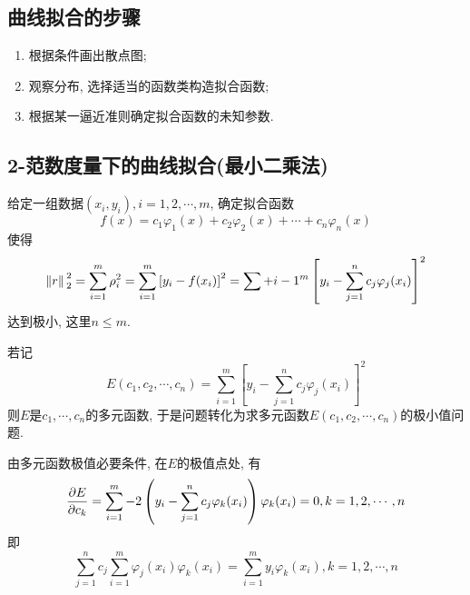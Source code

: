 \subsection{曲线拟合的步骤}

\begin{enumerate}
    \item 根据条件画出散点图;
    \item 观察分布, 选择适当的函数类构造拟合函数;
    \item 根据某一逼近准则确定拟合函数的未知参数.
\end{enumerate}

\subsection{2-范数度量下的曲线拟合(最小二乘法)}

给定一组数据$(x_i,y_i), i=1,2,\cdots,m$, 确定拟合函数
\begin{equation*}
    f(x)=c_1\varphi_1(x)+c_2\varphi_2(x)+\cdots+c_n\varphi_n(x)
\end{equation*}
使得
\begin{equation*}
    \norm*{r}_2^2=\sum_{i=1}^m\rho_i^2=\sum_{i=1}^m\left[y_i-f(x_i)\right]^2=\sum+{i-1}^m\left[y_i-\sum_{j=1}^nc_j\varphi_j(x_i)\right]^2
\end{equation*}
达到极小, 这里$n\le m$.

若记
\begin{equation*}
    E(c_1,c_2,\cdots,c_n)=\sum_{i=1}^m\left[y_i-\sum_{j=1}^nc_j\varphi_j(x_i)\right]^2
\end{equation*}
则$E$是$c_1,\cdots,c_n$的多元函数, 于是问题转化为求多元函数$E(c_1,c_2,\cdots,c_n)$的极小值问题.

由多元函数极值必要条件, 在$E$的极值点处, 有
\begin{equation*}
    \pdv{E}{c_k}=\sum_{i=1}^m-2\left(y_i-\sum_{j=1}^nc_j\varphi_k(x_i)\right)\varphi_k(x_i)=0, k=1,2,\cdots,n
\end{equation*}
即
\begin{equation*}
    \sum_{j=1}^nc_j\sum_{i=1}^m\varphi_j(x_i)\varphi_k(x_i)=\sum_{i=1}^my_i\varphi_k(x_i), k=1,2,\cdots,n
\end{equation*}

